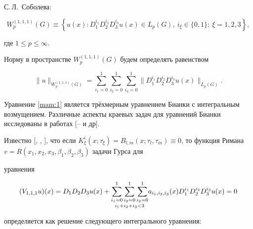 С.\,Л.~Соболева:

\[W_{p}^{(1, 1, 1)} (G)\equiv \left\{u(x):D_1 ^{i_1  } D_2 ^{i_2  } D_3 ^{i_3  } u(x)\in L_{p} (G),\ i_\xi \in\{0, 1\};\ \xi =1, 2, 3\right\},

\]

где $1\le p\le \infty $. 

Норму в пространстве $W_{p}^{\left(1,1,1\right)} (G)$ будем определять равенством

\[

\| u\| _{W_{p}^{(1, 1, 1)} (G)} =\sum\limits _{i_1  =0}^{1} \sum\limits _{i_2  =0}^{1} \sum\limits _{i_3  =0}^{1}\| D_1 ^{i_1  } D_2 ^{i_2  } D_3 ^{i_3  } u(x) \| _{L_{p} (G)} .

 \]



Уравнение \eqref{mam:1} является трёхмерным уравнением Бианки с интегральным возмущением. Различные аспекты краевых задач для уравнений Бианки исследованы в работах [-- и др].



Известно [, , ], что если $K_\xi ^{i}( x; \tau _\xi  )  = B_{l,m}\left( x;\tau _{l},\tau

_{m}\right) \!\equiv \!0$, то функция Римана $v=R\left( x_1 ,x_2 ,x_3 ,\beta _1 ,\beta _2 ,\beta _3 \right) $ задачи Гурса для

уравнения

\begin{equation}

( V_{1, 1, 1}u ) (x)=D_1 D_2 D_3 u(x)+\underset{%

i_1 +i_2 +i_3 <3}{\sum\limits_{i_1 =0}^1\sum\limits_{i_2 =0}^1\sum\limits_{i_3 =0}^1}%

a_{i_1 ,i_2 ,i_3 }(x)D_1 ^{i_1 }D_2 ^{i_2 }D_3 ^{i_3 }u(x)=0%

\label{1^0}

\end{equation}

определяется как решение следующего интегрального уравнения:

